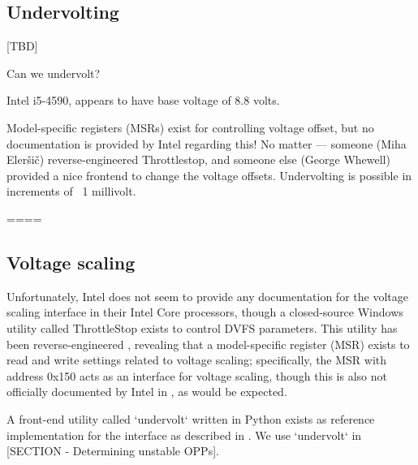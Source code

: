 \subsection{Undervolting}

[TBD]

Can we undervolt?

Intel i5-4590, appears to have base voltage of 8.8 volts.

Model-specific registers (MSRs) exist for controlling voltage offset, but no
documentation is provided by Intel regarding this!
No matter — someone (Miha Eleršič) reverse-engineered Throttlestop, and someone
else (George Whewell) provided a nice frontend to change the voltage offsets.
Undervolting is possible in increments of ~1 millivolt.

====

\subsection{Voltage scaling}

Unfortunately, Intel does not seem to provide any documentation for the voltage
scaling interface in their Intel Core processors, though a closed-source
Windows utility called ThrottleStop \cite{throttlestop} exists to control DVFS
parameters. This utility has been reverse-engineered \cite{elersicDoc},
revealing that a model-specific register (MSR) exists to read and write settings
related to voltage scaling; specifically, the MSR with address 0x150 acts as an
interface for voltage scaling, though this is also not officially documented by
Intel in \cite[Volume 4, §2.13]{intelDevManual}, as would be expected.

A front-end utility called `undervolt` \cite{whewellUndervolt} written in Python
exists as reference implementation for the interface as described in
\cite{elersicDoc}. We use `undervolt` in [SECTION - Determining unstable OPPs].
